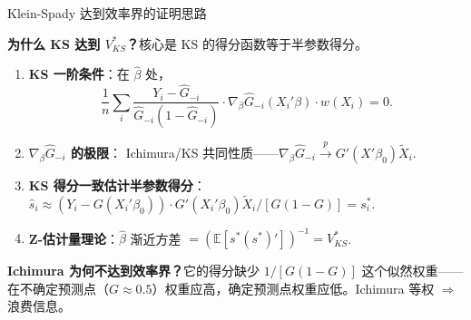 \documentclass[aspectratio=169, 10pt]{beamer}
\begin{document}
\begin{frame}{Klein-Spady 达到效率界的证明思路}

  \textbf{为什么 KS 达到 $V^{*}_{KS}$？}核心是 KS 的得分函数等于半参数得分。

  \begin{enumerate}\setlength{\itemsep}{2pt}
    \item \textbf{KS 一阶条件}：在 $\hat\beta$ 处，
    $$\frac{1}{n}\sum_i \frac{Y_i - \hat G_{-i}}{\hat G_{-i}(1 - \hat G_{-i})}
    \cdot \nabla_\beta \hat G_{-i}(X_i'\beta) \cdot w(X_i) = 0.$$

    \item \textbf{$\nabla_\beta \hat G_{-i}$ 的极限}：
    Ichimura/KS 共同性质——$\nabla_\beta \hat G_{-i} \overset{p}{\to} G'(X'\beta_0) \tilde X_i$.

    \item \textbf{KS 得分一致估计半参数得分}：
    $\hat s_i \approx (Y_i - G(X_i'\beta_0)) \cdot G'(X_i'\beta_0) \tilde X_i / [G(1-G)] = s^{*}_i$.

    \item \textbf{Z-估计量理论}：$\hat\beta$ 渐近方差 $= (\mathbb{E}[s^{*}(s^{*})'])^{-1} = V^{*}_{KS}$.
  \end{enumerate}

  \begin{highlightbox}
    \textbf{Ichimura 为何不达到效率界？}它的得分缺少 $1/[G(1-G)]$ 这个似然权重——
    在不确定预测点（$G \approx 0.5$）权重应高，确定预测点权重应低。Ichimura 等权 $\Rightarrow$ 浪费信息。
  \end{highlightbox}

  \hypertarget{main-c11}{}
  \hfill{\scriptsize\hyperlink{proof-c11}{}}

\end{frame}
\end{document}
